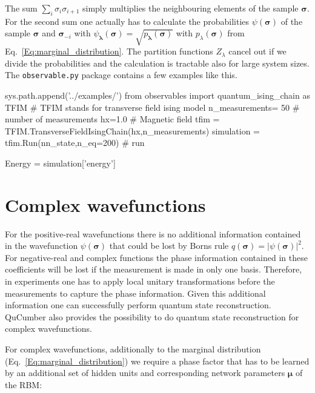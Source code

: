 \documentclass[submission, Phys]{SciPost}
\begin{document}
The sum $\sum_i \sigma_i \sigma_{i+1}$ simply multiplies the neighbouring elements of the sample $\bm{\sigma}$. For the second sum one actually has to calculate the probabilities $\psi (\bm{\sigma})$ of the sample $\bm{\sigma}$ and $\bm{\sigma}_{-i} $ with
$\psi_{\bm{\lambda}}(\bm{\sigma}) = \sqrt{p_{\bm{\lambda}}(\bm{\sigma})}$
with $p_{\lambda}(\bm{\sigma})$ from Eq.~\ref{Eq:marginal_distribution}. The partition functions $Z_{\lambda}$ cancel out if we divide the probabilities and the calculation is tractable also for large system sizes.
The \verb|observable.py| package contains a few examples like this.

\begin{python}
	sys.path.append('../examples/')
	from observables import quantum_ising_chain as TFIM
	# TFIM stands for transverse field ising model
	n_measurements= 50 # number of measurements
	hx=1.0       # Magnetic field
	tfim = TFIM.TransverseFieldIsingChain(hx,n_measurements)
	simulation = tfim.Run(nn_state,n_eq=200) # run

	Energy = simulation['energy']
\end{python}



\section{Complex wavefunctions}
\label{Sec:Training_QuCumber_on_complex_wavefunctions}

For the positive-real wavefunctions there is no additional information contained in the wavefunction
$\psi( \boldsymbol{\sigma})$ that could be lost by Borns rule $q(\boldsymbol{\sigma}) = | \psi( \boldsymbol{\sigma} ) |^2$.
For negative-real and complex functions the phase information contained in these coefficients will be lost if the measurement
is made in only one basis. Therefore, in experiments one has to apply local unitary transformations before the measurements
to capture the phase information. Given this additional information one can successfully perform quantum state reconstruction.
QuCumber also provides the possibility to do quantum state reconstruction for complex wavefunctions.

For complex wavefunctions, additionally to the marginal distribution (Eq.~\ref{Eq:marginal_distribution}) we require a phase factor
that has to be learned by an additional set of hidden units and corresponding network parameters $\bm{\mu}$ of the RBM:
\end{document}
